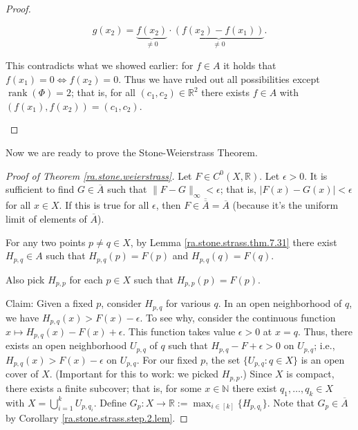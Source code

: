 \begin{proof}
\begin{itemize}
\[
g(x_2) = \underbrace{f(x_2)}_{\neq 0} \cdot \underbrace{(f(x_2) - f(x_1))}_{\neq 0} .
\]

This contradicts what we showed earlier: for \(f \in A\) it holds that \(f(x_1) = 0 \iff f(x_2) = 0\). Thus we have ruled out all possibilities except \(\operatorname{rank}(\Phi) = 2\); that is, for all \((c_1, c_2) \in \mathbb{R}^2\) there exists \(f \in A\) with \((f(x_1), f(x_2)) = (c_1, c_2)\). 

\end{itemize}

\end{proof}

Now we are ready to prove the Stone-Weierstrass Theorem.

\begin{proof}[Proof of Theorem \ref{ra.stone.weierstrass}]

Let \(F \in C^0(X, \mathbb{R})\). Let \(\epsilon > 0\). It is sufficient to find \(G \in \overline{A}\) such that \(\lVert F - G \rVert_\infty < \epsilon\); that is, \(|F(x) - G(x)| < \epsilon\) for all \(x \in X\). If this is true for all \(\epsilon\), then \(F \in \overline{\overline{A}} = \overline{A}\) (because it's the uniform limit of elements of \(\overline{A}\)).

For any two points \(p \neq q \in X\), by Lemma \ref{ra.stone.strass.thm.7.31} there exist \(H_{p,q} \in A\) such that \(H_{p,q}(p) = F(p)\) and \(H_{p,q}(q) = F(q)\). 

Also pick \(H_{p,p}\) for each \(p \in X\) such that \(H_{p,p}(p) = F(p)\). 

Claim: Given a fixed \(p\), consider \(H_{p,q}\) for various \(q\). In an open neighborhood of \(q\), we have \(H_{p,q}(x) > F(x) - \epsilon\). To see why, consider the continuous function \(x \mapsto H_{p,q}(x) - F(x) + \epsilon\). This function takes value \(\epsilon > 0\) at \(x = q\). Thus, there exists an open neighborhood \(U_{p,q}\) of \(q\) such that \(H_{p,q} - F + \epsilon > 0\) on \(U_{p,q}\); i.e., \(H_{p,q}(x) > F(x) - \epsilon\) on \(U_{p,q}\). For our fixed \(p\), the set \(\{U_{p,q}: q \in X\}\) is an open cover of \(X\). (Important for this to work: we picked \(H_{p,p}\).) Since \(X\) is compact, there exists a finite subcover; that is, for some \(x \in \mathbb{N}\) there exist \(q_1, \ldots, q_k \in X\) with \(X = \bigcup_{i=1}^k U_{p,q_i}\). Define \(G_p: X \to \mathbb{R} := \max_{i \in [k]} \{H_{p, q_i}\}\). Note that \(G_p \in \overline{A}\) by Corollary \ref{ra.stone.strass.step.2.lem}. 


\end{proof}
